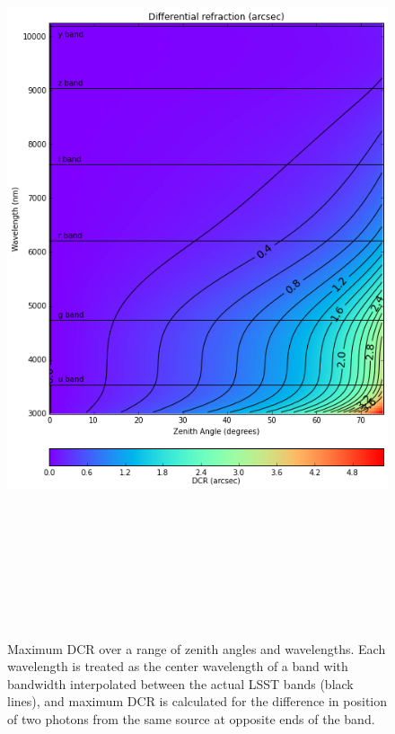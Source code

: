 \documentclass[]{article}
\begin{document}
\begin{figure}
	\begin{center}
		\includegraphics[height=9in]{DCR_ZA-wavelength}
		\caption{Maximum DCR over a range of zenith angles and wavelengths. Each wavelength is treated as the center wavelength of a band with bandwidth interpolated between the actual LSST bands (black lines), and maximum DCR is calculated for the difference in position of two photons from the same source at opposite ends of the band.}
		\label{Fig:DCR-wavelength-ZA}
\end{center}
\end{figure}
\end{document}
